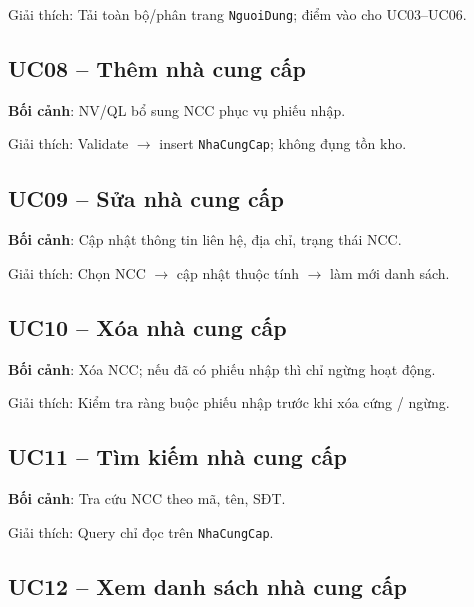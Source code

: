Giải thích: Tải toàn bộ/phân trang \texttt{NguoiDung}; điểm vào cho UC03--UC06.

\subsection{UC08 -- Thêm nhà cung cấp}

\textbf{Bối cảnh}: NV/QL bổ sung NCC phục vụ phiếu nhập.



Giải thích: Validate $\rightarrow$ insert \texttt{NhaCungCap}; không đụng tồn kho.

\subsection{UC09 -- Sửa nhà cung cấp}

\textbf{Bối cảnh}: Cập nhật thông tin liên hệ, địa chỉ, trạng thái NCC.



Giải thích: Chọn NCC $\rightarrow$ cập nhật thuộc tính $\rightarrow$ làm mới danh sách.

\subsection{UC10 -- Xóa nhà cung cấp}

\textbf{Bối cảnh}: Xóa NCC; nếu đã có phiếu nhập thì chỉ ngừng hoạt động.



Giải thích: Kiểm tra ràng buộc phiếu nhập trước khi xóa cứng / ngừng.

\subsection{UC11 -- Tìm kiếm nhà cung cấp}

\textbf{Bối cảnh}: Tra cứu NCC theo mã, tên, SĐT.



Giải thích: Query chỉ đọc trên \texttt{NhaCungCap}.

\subsection{UC12 -- Xem danh sách nhà cung cấp}


